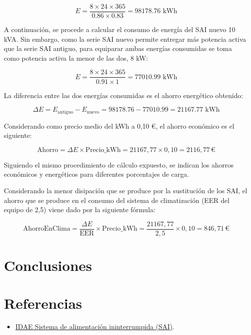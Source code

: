 \begin{Form}
\[
E = \frac{8 \times 24 \times 365}{0.86 \times 0.83} = 98178.76 \text{ kWh}
\]

A continuación, se procede a calcular el consumo de energía del SAI nuevo 10 kVA. Sin embargo, como la serie SAI nuevo permite entregar más potencia activa que la serie SAI antiguo, para equiparar ambas energías consumidas se toma como potencia activa la menor de las dos, 8 kW:

\[
E = \frac{8 \times 24 \times 365}{0.91 \times 1} = 77010.99 \text{ kWh}
\]

La diferencia entre las dos energías consumidas es el ahorro energético obtenido:

\[
\Delta E = E_{\text{antiguo}} - E_{\text{nuevo}} = 98178.76 - 77010.99 = 21167.77 \text{ kWh}
\]



Considerando como precio medio del kWh a 0,10 €, el ahorro económico es el siguiente:

\[
\text{Ahorro} = \Delta E \times \text{Precio\_kWh} = 21167,77 \times 0,10 = 2116,77 \, \text{€}
\]

Siguiendo el mismo procedimiento de cálculo expuesto, se indican los ahorros económicos y energéticos para diferentes porcentajes de carga.

Considerando la menor disipación que se produce por la sustitución de los SAI, el ahorro que se produce en el consumo del sistema de climatización (EER del equipo de 2,5) viene dado por la siguiente fórmula:

\[
\text{AhorroEnClima} = \frac{\Delta E}{\text{EER}} \times \text{Precio\_kWh} = \frac{21167,77}{2,5} \times 0,10 = 846,71 \, \text{€}
\]




















\section{Conclusiones}

\section{Referencias}
\begin{itemize}
    \item \href{https://www.idae.es/tecnologias/eficiencia-energetica/edificacion/sistema-de-alimentacion-ininterrumpida-sai}
    {IDAE Sistema de alimentación ininterrumpida (SAI)}.

\end{itemize}

\end{Form}

